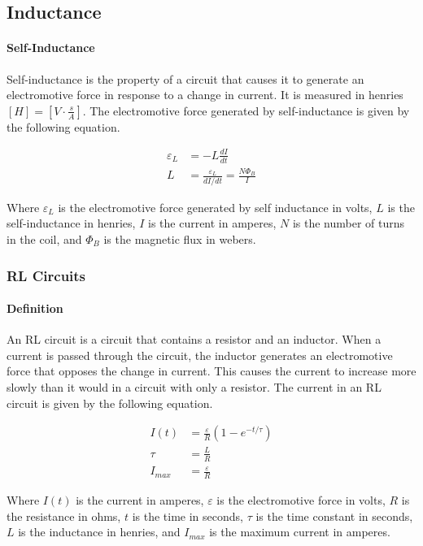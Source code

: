 \subsection{Inductance}
\hrulefill

\paragraph*{Self-Inductance}
Self-inductance is the property of a circuit that causes it to generate an electromotive force in response to a change in current. It is measured in henries $[H] = [V\cdot \frac{s}{A}]$. The electromotive force generated by self-inductance is given by the following equation.

\begin{align*}
    \varepsilon_L &= -L\frac{dI}{dt}\\
    L &= \frac{\varepsilon_L}{dI/dt} = \frac{N\Phi_B}{I}
\end{align*}

Where $\varepsilon_L$ is the electromotive force generated by self inductance in volts, $L$ is the self-inductance in henries, $I$ is the current in amperes, $N$ is the number of turns in the coil, and $\Phi_B$ is the magnetic flux in webers.\\

\subsubsection*{RL Circuits}
\paragraph*{Definition}
An RL circuit is a circuit that contains a resistor and an inductor. When a current is passed through the circuit, the inductor generates
an electromotive force that opposes the change in current. This causes the current to increase more slowly than it would in a circuit with
only a resistor. The current in an RL circuit is given by the following equation.

\begin{align*}
    I(t) &= \frac{\varepsilon}{R}(1 - e^{-t/\tau})\\
    \tau &= \frac{L}{R}\\
    I_{max} &= \frac{\varepsilon}{R} 
\end{align*}

Where $I(t)$ is the current in amperes, $\varepsilon$ is the electromotive force in volts, $R$ is the resistance in ohms, $t$ is the time in seconds,
$\tau$ is the time constant in seconds, $L$ is the inductance in henries, and $I_{max}$ is the maximum current in amperes.\\


